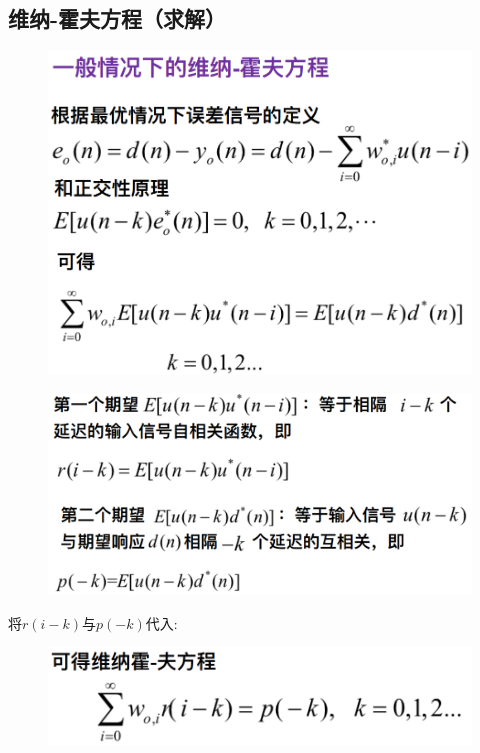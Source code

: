 \documentclass[UTF8]{ctexart} %
\begin{document}
		\subsection{维纳-霍夫方程（求解）}	
			\begin{figure}[H]
				\centering\includegraphics[scale=0.25]{12.png}
			\end{figure}
			\begin{figure}[H]
				\centering\includegraphics[scale=0.25]{13.png}
			\end{figure}
			
			将$r(i-k)$与$p(-k)$代入:

			\begin{figure}[H]
				\centering\includegraphics[scale=0.25]{15.png}
			\end{figure}
		
\end{document}
